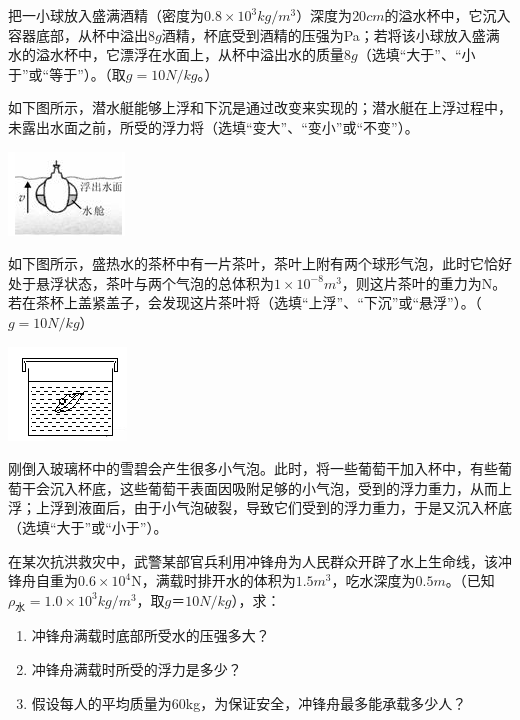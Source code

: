\documentclass[12pt,twoside]{exam}
\begin{document}
\begin{Aquestions}
\begin{questions}
\question
把一小球放入盛满酒精（密度为$0.8\times 10^3 kg/m^3$）深度为$20cm$的溢水杯中，它沉入容器底部，从杯中溢出$8g$酒精，杯底受到酒精的压强为\answerline*[$1.6\times 10^3$]Pa；若将该小球放入盛满水的溢水杯中，它漂浮在水面上，从杯中溢出水的质量\answerline*[大于]$8g$（选填“大于”、“小于”或“等于”）。（取$g=10N/kg$。）


\question
如下图所示，潜水艇能够上浮和下沉是通过改变来实现的；潜水艇在上浮过程中，未露出水面之前，所受的浮力将\answerline*[不变]（选填“变大”、“变小”或“不变”）。

\includegraphics[scale=1]{figures/图片+22.png} 


\question
如下图所示，盛热水的茶杯中有一片茶叶，茶叶上附有两个球形气泡，此时它恰好处于悬浮状态，茶叶与两个气泡的总体积为$1\times 10^{-8}m^3$，则这片茶叶的重力为\answerline*[$
1\times 10^{-4}$]N。若在茶杯上盖紧盖子，会发现这片茶叶将\answerline*[下沉]（选填“上浮”、“下沉”或“悬浮”）。（$g=10N/kg$）

\includegraphics[scale=1]{figures/图片+23.png} 


\question
刚倒入玻璃杯中的雪碧会产生很多小气泡。此时，将一些葡萄干加入杯中，有些葡萄干会沉入杯底，这些葡萄干表面因吸附足够的小气泡，受到的浮力\answerline*[大于]重力，从而上浮；上浮到液面后，由于小气泡破裂，导致它们受到的浮力\answerline*[小于]重力，于是又沉入杯底（选填“大于”或“小于”）。


\question
在某次抗洪救灾中，武警某部官兵利用冲锋舟为人民群众开辟了水上生命线，该冲锋舟自重为$0.6\times 10^4$N，满载时排开水的体积为$1.5m^3$，吃水深度为$0.5m$。（已知$\rho _\textrm{水} = 1.0\times 10^3kg/m^3$，取$g＝10N/kg$），求：
\begin{enumerate}
\item 冲锋舟满载时底部所受水的压强多大？
\item 冲锋舟满载时所受的浮力是多少？
\item 假设每人的平均质量为60kg，为保证安全，冲锋舟最多能承载多少人？
\end{enumerate}


\end{questions}
\end{Aquestions}
\end{document}
